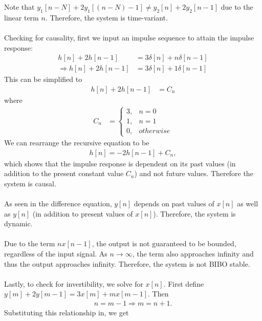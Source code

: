 \documentclass{report}
\begin{document}
\begin{solution}
    Note that $y_1[n-N] + 2y_1[(n-N)-1] \neq y_2[n] + 2y_2[n-1]$ due to the linear term $n$. Therefore, the system is time-variant. 
    \\ \\
    Checking for causality, first we input an impulse sequence to attain the impulse response:
    \begin{align*}
        h[n] + 2h[n-1] &= 3\delta[n] + n\delta[n-1] \\
        \Longrightarrow h[n] + 2h[n-1] &= 3\delta[n] + 1\delta[n-1]
    \end{align*}
    This can be simplified to 
    \begin{align*}
        h[n] + 2h[n-1] &= C_n
    \end{align*}
    where
    \begin{align*}
        C_n &= \begin{cases}
            3, & n = 0 \\
            1, & n = 1 \\
            0, & otherwise
        \end{cases}
    \end{align*}
    We can rearrange the recursive equation to be  
    \begin{align*}
        h[n] = -2h[n-1] + C_n, 
    \end{align*}
    which shows that the impulse response is dependent on its past values (in addition to the present constant value $C_n$) and not future values. Therefore the system is causal. 
    \\ \\
    As seen in the difference equation, $y[n]$ depends on past values of $x[n]$ as well as $y[n]$ (in addition to present values of $x[n]$). Therefore, the system is dynamic.
    \\ \\
    Due to the term $nx[n-1]$, the output is not guaranteed to be bounded, regardless of the input signal. As $n\rightarrow\infty$, the term also approaches infinity and thus the output approaches infinity. 
    Therefore, the system is not BIBO stable.
    \\ \\
    Lastly, to check for invertibility, we solve for $x[n]$. First define $y[m] + 2y[m-1] = 3x[m] + mx[m-1]$. Then 
    \begin{align*}
        n=m-1 \Longrightarrow m=n+1.
    \end{align*}
    Substituting this relationship in, we get 
    \begin{align*}

\end{align*}
\end{solution}
\end{document}
